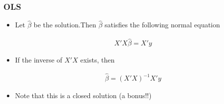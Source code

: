 \documentclass[
  shownotes,
  xcolor={svgnames},
  hyperref={colorlinks,citecolor=DarkBlue,linkcolor=DarkRed,urlcolor=DarkBlue}
  , aspectratio=169]{beamer}
\begin{document}

\begin{frame}
\frametitle{OLS}
\begin{itemize}
\item Let $\hat \beta$ be the solution.Then $\hat \beta$ satisfies the following normal equation

\begin{align}
X'X\hat \beta=X'y
\end{align}

\item If the inverse of $X'X$ exists, then

\begin{align}
\hat \beta=(X'X)^{-1}X'y
\end{align}

\item Note that this is a closed solution (a bonus!!)
\end{itemize}

\end{frame}
\end{document}
